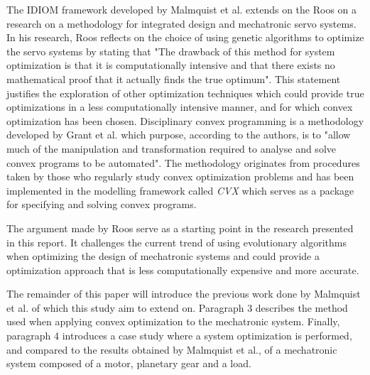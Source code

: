 \par
The IDIOM framework developed by Malmquist et al. extends on the Roos \cite{roos2007} on a research on a methodology for integrated design and mechatronic servo systems. In his research, Roos reflects on the choice of using genetic algorithms to optimize the servo systems by stating that "The drawback of this method for system optimization is that it is computationally intensive and that there exists no mathematical proof that it actually finds the true optimum". This statement justifies the exploration of other optimization techniques which could provide true optimizations in a less computationally intensive manner, and for which convex optimization has been chosen. Disciplinary convex programming is a methodology developed by Grant et al. \cite{gb08} which purpose, according to the authors, is to "allow much of the manipulation and transformation required to analyse and solve convex programs to be automated". The methodology originates from procedures taken by those who regularly study convex optimization problems and has been implemented in the modelling framework called \textit{CVX} \cite{cvx} which serves as a package for specifying and solving convex programs.

\par
The argument made by Roos serve as a starting point in the research presented in this report. It challenges the current trend of using evolutionary algorithms when optimizing the design of mechatronic systems and could provide a optimization approach that is less computationally expensive and more accurate. 

\par
The remainder of this paper will introduce the previous work done by Malmquist et al. of which this study aim to extend on. Paragraph 3 describes the method used when applying convex optimization to the mechatronic system. Finally, paragraph 4 introduces a case study where a system optimization is performed, and compared to the results obtained by Malmquist et al., of a mechatronic system composed of a motor, planetary gear and a load.  


